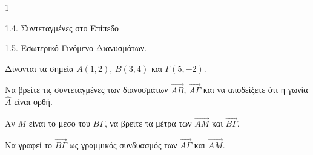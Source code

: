 \begin{ylh}{1}
    \item 1.4. Συντεταγμένες στο Επίπεδο
    \item 1.5. Εσωτερικό Γινόμενο Διανυσμάτων.
\end{ylh}
Δίνονται τα σημεία $A(1,2)$, $B(3,4)$ και $\Gamma(5,-2)$.
\begin{alist}
\item Να βρείτε τις συντεταγμένες των διανυσμάτων $\vec{AB}$, $\vec{A\Gamma}$ και να αποδείξετε ότι η γωνία $\hat{A}$ είναι ορθή. 
\item Αν $M$ είναι το μέσο του $B\Gamma$, να βρείτε τα μέτρα των $\vec{AM}$ και $\vec{B\Gamma}$. 
\item Να γραφεί το $\vec{B\Gamma}$ ως γραμμικός συνδυασμός των $\vec{A\Gamma}$ και $\vec{AM}$. 
\end{alist}